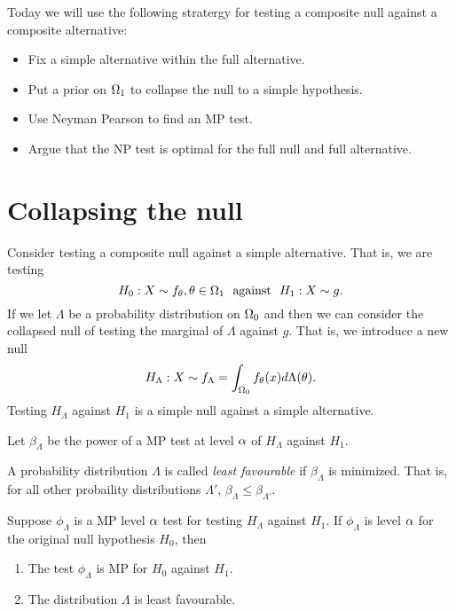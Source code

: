 Today we will use the following stratergy for testing a composite null against a composite alternative:
\begin{itemize}
    \item Fix a simple alternative within the full alternative.
    \item Put a prior on ${{\Omega}}_1$ to collapse the null to a simple hypothesis.
    \item Use Neyman Pearson to find an MP test.
    \item Argue that the NP test is optimal for the full null and full alternative.
\end{itemize}
\section{Collapsing the null}
Consider testing a composite null against a simple alternative. That is, we are testing 
\[H_0 : X \sim f_{\theta}, {\theta} \in {{\Omega}}_1 ~~\text{against}~~ H_1 :X \sim g. \]
If we let $\Lambda$ be a probability distribution on ${{\Omega}}_0$ and then we can consider the collapsed null of testing the marginal of $\Lambda$ against $g$. That is, we introduce a new null 
\[H_\Lambda : X \sim f_\Lambda = \int_{{{\Omega}}_0} f_{\theta}(x)d\Lambda({\theta}). \]
Testing $H_\Lambda$ against $H_1$ is a simple null against a simple alternative.
\begin{defn}
    Let $\beta_\Lambda$ be the power of a MP test at level ${\alpha}$ of $H_\Lambda$ against $H_1$.
\end{defn}
\begin{defn}
    A probability distribution $\Lambda$ is called \emph{least favourable} if $\beta_{\Lambda}$ is minimized. That is, for all other probaility distributions $\Lambda'$, $\beta_{\Lambda} \le \beta_{\Lambda'}$.
\end{defn}
\begin{thrm}[TSH 3.8.1]
    Suppose $\phi_\Lambda$ is a MP level ${\alpha}$ test for testing $H_\Lambda$ against $H_1$. If $\phi_{\Lambda}$ is level ${\alpha}$ for the original null hypothesis $H_0$, then
    \begin{enumerate}
        \item The test $\phi_\Lambda$ is MP for $H_0$ against $H_1$.
        \item The distribution $\Lambda$ is least favourable.
    \end{enumerate}
\end{thrm}
